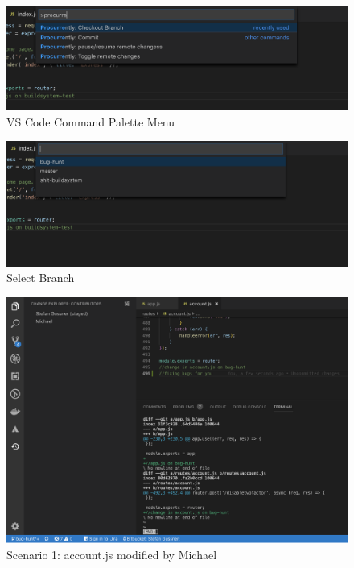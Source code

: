 \begin{figure}
    \centering
    \includegraphics[width=1\linewidth]{figures/screenshots/scenarios/1checkout_branch.png}
    \caption{VS Code Command Palette Menu}
    \label{fig:1checkout_branch_palette}
\end{figure}
\begin{figure}
    \centering
    \includegraphics[width=1\linewidth]{figures/screenshots/scenarios/1checkout_bughunt.png}
    \caption{Select Branch}
    \label{fig:1checkout_bughunt}
\end{figure}


\begin{figure}[h]
    \centering
    \includegraphics[width=1\textwidth]{figures/screenshots/scenarios/1staging_view.png}
    \caption{Scenario 1: account.js modified by Michael}
    \label{fig:1staging}
\end{figure}

